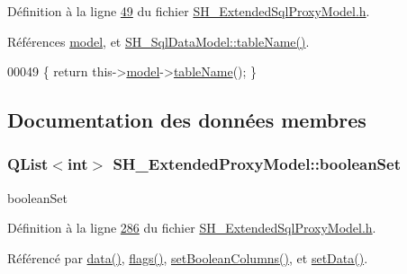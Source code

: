 Définition à la ligne \hyperlink{SH__ExtendedSqlProxyModel_8h_source_l00049}{49} du fichier \hyperlink{SH__ExtendedSqlProxyModel_8h_source}{S\-H\-\_\-\-Extended\-Sql\-Proxy\-Model.\-h}.



Références \hyperlink{classSH__ExtendedProxyModel_a8c8b8930c6b1abd9bbb1dce1fdc9690b}{model}, et \hyperlink{classSH__SqlDataModel_afced07f7b9e6fecd349a5428a1a4615e}{S\-H\-\_\-\-Sql\-Data\-Model\-::table\-Name()}.


\begin{DoxyCode}
00049 \{ \textcolor{keywordflow}{return} this->\hyperlink{classSH__ExtendedProxyModel_a8c8b8930c6b1abd9bbb1dce1fdc9690b}{model}->\hyperlink{classSH__SqlDataModel_afced07f7b9e6fecd349a5428a1a4615e}{tableName}(); \}
\end{DoxyCode}


\subsection{Documentation des données membres}
\hypertarget{classSH__ExtendedProxyModel_a7dd9cf1dd153b98220d217e9be1f0916}{
\subsubsection[{boolean\-Set}]{\setlength{\rightskip}{0pt plus 5cm}Q\-List$<$int$>$ S\-H\-\_\-\-Extended\-Proxy\-Model\-::boolean\-Set\hspace{0.3cm}{\ttfamily [private]}}}\label{classSH__ExtendedProxyModel_a7dd9cf1dd153b98220d217e9be1f0916}


boolean\-Set 



Définition à la ligne \hyperlink{SH__ExtendedSqlProxyModel_8h_source_l00286}{286} du fichier \hyperlink{SH__ExtendedSqlProxyModel_8h_source}{S\-H\-\_\-\-Extended\-Sql\-Proxy\-Model.\-h}.



Référencé par \hyperlink{classSH__ExtendedProxyModel_afbc947efbe1107fc5bf8926c52902a1c}{data()}, \hyperlink{classSH__ExtendedProxyModel_aa12f3d989293da24fb47fd96a080cdc0}{flags()}, \hyperlink{classSH__ExtendedProxyModel_a2acefd1604abfef312fdaa65e57c2234}{set\-Boolean\-Columns()}, et \hyperlink{classSH__ExtendedProxyModel_aaaddcc27fdce4ef70f242460b8e053da}{set\-Data()}.

